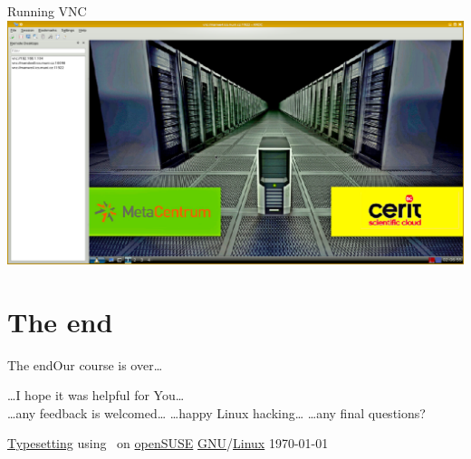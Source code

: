 \documentclass[compress, ucs, xelatex, 11pt, xcolor=svgnames,
  hyperref={
    bookmarks=true,
    unicode=true,
    colorlinks=true,
    pdftitle={Linux, command line and MetaCentrum},
    plainpages=false,
    pdfauthor={Vojtech Zeisek},
    pdfsubject={Course about use of Linux command line, writing shell scripts and using MetaCentrum of CESNET},
    pdfcreator={XeLaTeX, http://www.xelatex.org/},
    pdfkeywords={Linux, GNU, BASH, shell, command line, MetaCentrum},
    linkcolor=Sienna,
    anchorcolor=black,
    citecolor=green,
    filecolor=magenta,
    menucolor=Sienna,
    urlcolor=cyan,
    pdftex},
  url={hyphens, lowtilde} %
  ]{beamer}
\begin{document}
\begin{frame}{Running VNC}
\includegraphics[width=\textwidth]{vnc.png}
\end{frame}

\section{The end}

% 
% 
% 
% 

\begin{frame}{The end}{Our course is over\ldots}
\begin{center}
  \ldots I hope it was helpful for You\ldots\\
  \vfill
  \ldots any feedback is welcomed\ldots
  \vfill
  \ldots happy Linux hacking\ldots
  \vfill
  \ldots any final questions?
  \vfill
\end{center}
\begin{flushright}
  \begin{tiny}
   \href{https://en.wikipedia.org/wiki/XeTeX}{Typesetting} using \XeLaTeX~on \href{https://www.opensuse.org/}{openSUSE} \href{https://en.wikipedia.org/wiki/GNU}{GNU}/\href{https://en.wikipedia.org/wiki/Linux}{Linux} \today
  \end{tiny}
\end{flushright}
\end{frame}
\end{document}
